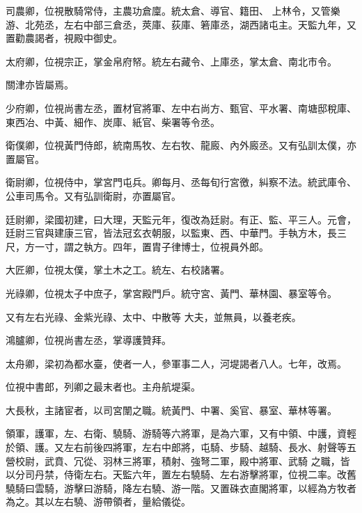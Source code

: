 \begin{pinyinscope}
 司農卿，位視散騎常侍，主農功倉廩。統太倉、導官、籍田、
 上林令，又管樂游、北苑丞，左右中部三倉丞，莢庫、荻庫、箬庫丞，湖西諸屯主。天監九年，又置勸農謁者，視殿中御史。



 太府卿，位視宗正，掌金帛府帑。統左右藏令、上庫丞，掌太倉、南北市令。



 關津亦皆屬焉。



 少府卿，位視尚書左丞，置材官將軍、左中右尚方、甄官、平水署、南塘邸稅庫、東西冶、中黃、細作、炭庫、紙官、柴署等令丞。



 衛僕卿，位視黃門侍郎，統南馬牧、左右牧、龍廄、內外廄丞。又有弘訓太僕，亦置屬官。



 衛尉卿，位視侍中，掌宮門屯兵。卿每月、丞每旬行宮徼，糾察不法。統武庫令、公車司馬令。又有弘訓衛尉，亦置屬官。



 廷尉卿，梁國初建，曰大理，天監元年，復改為廷尉。有正、監、平三人。元會，廷尉三官與建康三官，皆法冠玄衣朝服，以監東、西、中華門。手執方木，長三尺，方一寸，謂之執方。四年，置胄子律博士，位視員外郎。



 大匠卿，位視太僕，掌土木之工。統左、右校諸署。



 光祿卿，位視太子中庶子，掌宮殿門戶。統守宮、黃門、華林園、暴室等令。



 又有左右光祿、金紫光祿、太中、中散等
 大夫，並無員，以養老疾。



 鴻臚卿，位視尚書左丞，掌導護贊拜。



 太舟卿，梁初為都水臺，使者一人，參軍事二人，河堤謁者八人。七年，改焉。



 位視中書郎，列卿之最末者也。主舟航堤渠。



 大長秋，主諸宦者，以司宮闈之職。統黃門、中署、奚官、暴室、華林等署。



 領軍，護軍，左、右衛、驍騎、游騎等六將軍，是為六軍，又有中領、中護，資輕於領、護。又左右前後四將軍，左右中郎將，屯騎、步騎、越騎、長水、射聲等五營校尉，武賁、冗從、羽林三將軍，積射、強弩二軍，殿中將軍、武騎
 之職，皆以分司丹禁，侍衛左右。天監六年，置左右驍騎、左右游擊將軍，位視二率。改舊驍騎曰雲騎，游擊曰游騎，降左右驍、游一階。又置硃衣直閣將軍，以經為方牧者為之。其以左右驍、游帶領者，量給儀從。




\end{pinyinscope}
